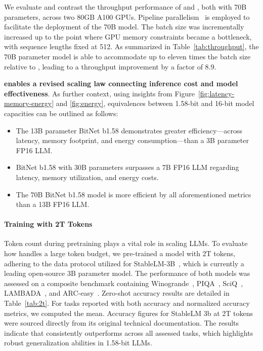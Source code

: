 We evaluate and contrast the throughput performance of  and , both with 70B parameters, across two 80GB A100 GPUs. Pipeline parallelism~\cite{gpipe} is employed to facilitate the deployment of the  70B model. The batch size was incrementally increased up to the point where GPU memory constraints became a bottleneck, with sequence lengths fixed at 512. As summarized in Table~\ref{tab:throughput}, the 70B parameter  model is able to accommodate up to eleven times the batch size relative to , leading to a throughput improvement by a factor of 8.9.

\textbf{ enables a revised scaling law connecting inference cost and model effectiveness}. As further context, using insights from Figure~\ref{fig:latency-memory-energy} and \ref{fig:energy}, equivalences between 1.58-bit and 16-bit model capacities can be outlined as follows:

\begin{itemize}
    \item The 13B parameter BitNet b1.58 demonstrates greater efficiency—across latency, memory footprint, and energy consumption—than a 3B parameter FP16 LLM.
    \item BitNet b1.58 with 30B parameters surpasses a 7B FP16 LLM regarding latency, memory utilization, and energy costs.
    \item The 70B BitNet b1.58 model is more efficient by all aforementioned metrics than a 13B FP16 LLM.
\end{itemize}

\paragraph{Training with 2T Tokens}

Token count during pretraining plays a vital role in scaling LLMs. To evaluate how  handles a large token budget, we pre-trained a  model with 2T tokens, adhering to the data protocol utilized for StableLM-3B~\cite{StableLM-3B-4E1T}, which is currently a leading open-source 3B parameter model. The performance of both models was assessed on a composite benchmark containing Winogrande~\cite{winoGrande}, PIQA~\cite{piqa}, SciQ~\cite{sciq}, LAMBADA~\cite{lambada}, and ARC-easy~\cite{arc}. Zero-shot accuracy results are detailed in Table~\ref{tab:2t}. For tasks reported with both accuracy and normalized accuracy metrics, we computed the mean. Accuracy figures for StableLM 3b at 2T tokens were sourced directly from its original technical documentation. The results indicate that  consistently outperforms across all assessed tasks, which highlights robust generalization abilities in 1.58-bit LLMs.

